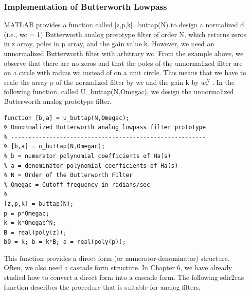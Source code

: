 \documentclass{article}
\begin{document}
\subsubsection{Implementation of Butterworth Lowpass}
MATLAB provides a function called [z,p,k]=buttap(N) to design a normalized
d (i.e., wc = 1) Butterworth analog prototype filter of order N, which returns zeros in z array, poles in p array, and the gain value k.
However, we need an unnormalized Butterworth filter with arbitrary wc.
From the example above, we observe that there are no zeros and that the poles
of the unnormalized filter are on a circle with radius wc instead of on a
unit circle. This means that we have to scale the array p of the normalized filter by wc and the gain k by $w_c^N$ . In the following function, called
U\_buttap(N,Omegac), we design the unnormalized Butterworth analog
prototype filter.
\begin{lstlisting}
function [b,a] = u_buttap(N,Omegac);
% Unnormalized Butterworth analog lowpass filter prototype
% --------------------------------------------------------
% [b,a] = u_buttap(N,Omegac);
% b = numerator polynomial coefficients of Ha(s)
% a = denominator polynomial coefficients of Ha(s)
% N = Order of the Butterworth Filter
% Omegac = Cutoff frequency in radians/sec
%
[z,p,k] = buttap(N);
p = p*Omegac;
k = k*Omegac^N;
B = real(poly(z));
b0 = k; b = k*B; a = real(poly(p));    
\end{lstlisting}
This function provides a direct form (or numerator-denominator) structure. Often, we also need a cascade form structure. In Chapter 6, we have
already studied how to convert a direct form into a cascade form. The
following sdir2cas function describes the procedure that is suitable for
analog filters.
\end{document}
